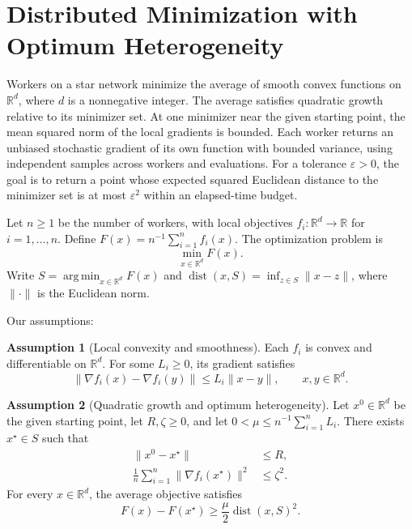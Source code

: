 \documentclass[10pt]{article}
\theoremstyle{definition}
\newtheorem{assumption}{Assumption}
\begin{document}
\section*{Distributed Minimization with Optimum Heterogeneity}
Workers on a star network minimize the average of smooth convex functions on $\mathbb{R}^d$, where $d$ is a nonnegative integer. The average satisfies quadratic growth relative to its minimizer set. At one minimizer near the given starting point, the mean squared norm of the local gradients is bounded. Each worker returns an unbiased stochastic gradient of its own function with bounded variance, using independent samples across workers and evaluations. For a tolerance $\varepsilon>0$, the goal is to return a point whose expected squared Euclidean distance to the minimizer set is at most $\varepsilon^2$ within an elapsed-time budget.

Let $n\geq 1$ be the number of workers, with local objectives $f_i:\mathbb{R}^d\to\mathbb{R}$ for $i=1,\ldots,n$. Define $F(x)=n^{-1}\sum_{i=1}^n f_i(x)$. The optimization problem is
\[
\min_{x\in\mathbb{R}^d} F(x).
\]
Write $S=\operatorname*{arg\,min}_{x\in\mathbb{R}^d}F(x)$ and $\operatorname{dist}(x,S)=\inf_{z\in S}\|x-z\|$, where $\|\cdot\|$ is the Euclidean norm.

Our assumptions:
\begin{assumption}[Local convexity and smoothness]
Each $f_i$ is convex and differentiable on $\mathbb{R}^d$. For some $L_i\geq 0$, its gradient satisfies
\[
\|\nabla f_i(x)-\nabla f_i(y)\|\leq L_i\|x-y\|,
\qquad x,y\in\mathbb{R}^d.
\]
\end{assumption}

\begin{assumption}[Quadratic growth and optimum heterogeneity]
Let $x^0\in\mathbb{R}^d$ be the given starting point, let $R,\zeta\geq 0$, and let $0<\mu\leq n^{-1}\sum_{i=1}^n L_i$. There exists $x^\star\in S$ such that
\[
\begin{aligned}
\|x^0-x^\star\| &\leq R,\\
\frac{1}{n}\sum_{i=1}^n\|\nabla f_i(x^\star)\|^2 &\leq \zeta^2.
\end{aligned}
\]
For every $x\in\mathbb{R}^d$, the average objective satisfies
\[
F(x)-F(x^\star)\geq \frac{\mu}{2}\operatorname{dist}(x,S)^2.
\]
\end{assumption}
\end{document}
